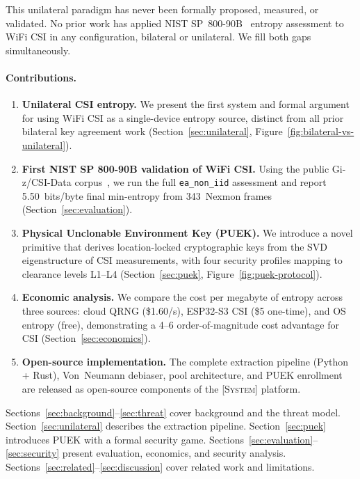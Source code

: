 \documentclass[sigconf,anonymous,review]{acmart}
\newcommand{\zipminator}{\textsc{[System]}\xspace}
\begin{document}
This unilateral paradigm has never been formally proposed, measured, or validated.
No prior work has applied NIST SP~800-90B~\cite{nist2018sp80090b} entropy assessment to WiFi CSI in any configuration, bilateral or unilateral.
We fill both gaps simultaneously.

\paragraph{Contributions.}
\begin{enumerate}
\item \textbf{Unilateral CSI entropy.}
We present the first system and formal argument for using WiFi CSI as a single-device entropy source, distinct from all prior bilateral key agreement work (Section~\ref{sec:unilateral}, Figure~\ref{fig:bilateral-vs-unilateral}).

\item \textbf{First NIST SP 800-90B validation of WiFi CSI.}
Using the public Gi-z/CSI-Data corpus~\cite{gringoli2019csidata}, we run the full \texttt{ea\_non\_iid} assessment and report 5.50~bits/byte final min-entropy from 343~Nexmon frames (Section~\ref{sec:evaluation}).

\item \textbf{Physical Unclonable Environment Key (PUEK).}
We introduce a novel primitive that derives location-locked cryptographic keys from the SVD eigenstructure of CSI measurements, with four security profiles mapping to clearance levels L1--L4 (Section~\ref{sec:puek}, Figure~\ref{fig:puek-protocol}).

\item \textbf{Economic analysis.}
We compare the cost per megabyte of entropy across three sources: cloud QRNG (\$1.60/s), ESP32-S3 CSI (\$5 one-time), and OS entropy (free), demonstrating a 4--6 order-of-magnitude cost advantage for CSI (Section~\ref{sec:economics}).

\item \textbf{Open-source implementation.}
The complete extraction pipeline (Python + Rust), Von~Neumann debiaser, pool architecture, and PUEK enrollment are released as open-source components of the \zipminator platform.
\end{enumerate}

\noindent
Sections~\ref{sec:background}--\ref{sec:threat} cover background and the threat model.
Section~\ref{sec:unilateral} describes the extraction pipeline.
Section~\ref{sec:puek} introduces PUEK with a formal security game.
Sections~\ref{sec:evaluation}--\ref{sec:security} present evaluation, economics, and security analysis.
Sections~\ref{sec:related}--\ref{sec:discussion} cover related work and limitations.
\end{document}
